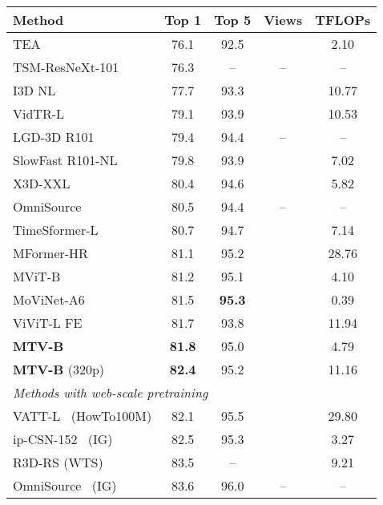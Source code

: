 \begin{table*}[t]
\begin{subtable}[t]{.39\linewidth}
		\vspace{-0.3\baselineskip}
		\scriptsize{
			\begin{tabular}{lcccc}
				\toprule
				Method 																			 & Top 1                & Top 5         & Views 	& TFLOPs \\
				\midrule
				TEA~\cite{li_tea_cvpr_2020}												& 76.1					& 92.5 &  & 2.10 \\  TSM-ResNeXt-101~\cite{lin_tsm_cvpr_2019}						  & 76.3				 & -- &  -- & -- \\I3D NL~\cite{wang2018nonlocal}										 & 77.7                  & 93.3         		 &   & 10.77     \\ 
				VidTR-L~\cite{zhang2021vidtr} & 79.1 & 93.9 &  & 10.53 \\
				LGD-3D R101~\cite{qiu2019learning}							&  79.4				    & 94.4			 		&  --	& --					\\  
				SlowFast R101-NL~\cite{feichtenhofer_iccv_2019}       		&  79.8                 &  93.9                   &     & 7.02   \\  X3D-XXL~\cite{feichtenhofer_cvpr_2020}      					&  80.4					&  94.6			  		&    & 5.82   \\
				OmniSource~\cite{duan2020omni} & 80.5 & 94.4 & -- & -- \\
				TimeSformer-L~\cite{bertasius_arxiv_2021} & 80.7				& 94.7					&  & 7.14 \\
				MFormer-HR~\cite{patrick2021keeping} & 81.1 & 95.2 &  & 28.76 \\
				MViT-B~\cite{fan2021multiscale}					  	& 81.2				& 95.1					&  & 4.10 \\
				MoViNet-A6~\cite{kondratyuk2021movinets} & 81.5 	&  \textbf{95.3}  &  & 0.39  \\  ViViT-L FE~\cite{arnab2021vivit} & 81.7 	&  93.8  &  &  11.94 \\  \textbf{MTV-B} & \textbf{81.8}  & 95.0 	&  & 4.79 \\ \textbf{MTV-B} (320p) & \textbf{82.4}  & 95.2 	&  & 11.16 \\ \midrule
				\multicolumn{4}{l}{\textit{Methods with web-scale pretraining}}                                \\ 
				VATT-L~\cite{akbari2021vatt} (HowTo100M)  &  82.1 &  95.5 	&  & 29.80 \\  ip-CSN-152~\cite{tran_iccv_2019} (IG) 			  &  82.5					& 95.3			&   & 3.27	  \\
				R3D-RS (WTS)~\cite{du2021revisiting} & 83.5 & -- &  & 9.21  \\
				OmniSource~\cite{duan2020omni} (IG) & 83.6 & 96.0 & -- & -- \\

\end{tabular}}
\end{subtable}
\end{table*}

